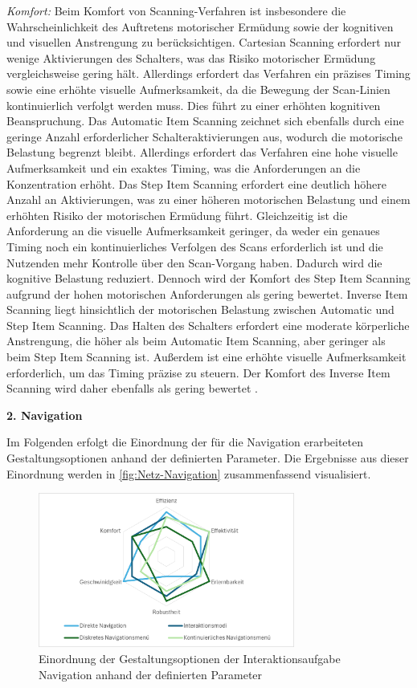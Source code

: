 \textit{Komfort:} 
Beim Komfort von Scanning-Verfahren ist insbesondere die Wahrscheinlichkeit des Auftretens motorischer Ermüdung sowie der kognitiven und visuellen Anstrengung zu berücksichtigen.
Cartesian Scanning erfordert nur wenige Aktivierungen des Schalters, was das Risiko motorischer Ermüdung vergleichsweise gering hält. Allerdings erfordert das Verfahren ein präzises Timing sowie eine erhöhte visuelle Aufmerksamkeit, da die Bewegung der Scan-Linien kontinuierlich verfolgt werden muss. Dies führt zu einer erhöhten kognitiven Beanspruchung. Das Automatic Item Scanning zeichnet sich ebenfalls durch eine geringe Anzahl erforderlicher Schalteraktivierungen aus, wodurch die motorische Belastung begrenzt bleibt. Allerdings erfordert das Verfahren eine hohe visuelle Aufmerksamkeit und ein exaktes Timing, was die Anforderungen an die Konzentration erhöht. Das Step Item Scanning erfordert eine deutlich höhere Anzahl an Aktivierungen, was zu einer höheren motorischen Belastung und einem erhöhten Risiko der motorischen Ermüdung führt. Gleichzeitig ist die Anforderung an die visuelle Aufmerksamkeit geringer, da weder ein genaues Timing noch ein kontinuierliches Verfolgen des Scans erforderlich ist und die Nutzenden mehr Kontrolle über den Scan-Vorgang haben. Dadurch wird die kognitive Belastung reduziert. Dennoch wird der Komfort des Step Item Scanning aufgrund der hohen motorischen Anforderungen als gering bewertet. Inverse Item Scanning liegt hinsichtlich der motorischen Belastung zwischen Automatic und Step Item Scanning. Das Halten des Schalters erfordert eine moderate körperliche Anstrengung, die höher als beim Automatic Item Scanning, aber geringer als beim Step Item Scanning ist. Außerdem ist eine erhöhte visuelle Aufmerksamkeit erforderlich, um das Timing präzise zu steuern. Der Komfort des Inverse Item Scanning wird daher ebenfalls als gering bewertet \citep{COOK2015117}.

\textbf{2. Navigation} 

Im Folgenden erfolgt die Einordnung der für die Navigation erarbeiteten Gestaltungsoptionen anhand der definierten Parameter. Die Ergebnisse aus dieser Einordnung werden in \autoref{fig:Netz-Navigation} zusammenfassend visualisiert. 

\begin{figure}[tbh]
    \centering
    \includegraphics[width=0.75\textwidth]{images/Netzdiagramm-Navigation.png}
    \caption{Einordnung der Gestaltungsoptionen der Interaktionsaufgabe Navigation anhand der definierten Parameter}
    \label{fig:Netz-Navigation}
\end{figure}

